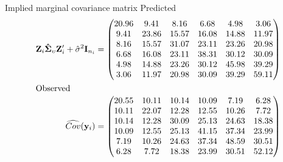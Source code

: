 \documentclass[aspectratio=169]{beamer}
\newcommand{\vect}[1]{\mathbf{#1}}
\newcommand{\mat}[1]{\mathbf{#1}}
\newcommand{\gmat}[1]{\boldsymbol{#1}}
\begin{document}
\begin{frame}[fragile]{Implied marginal covariance matrix}
Predicted
\begin{align*}
  \mat{Z}_i \gmat{\hat\Sigma}_\upsilon \mat{Z}'_i +
    \hat\sigma^2 \mat{I}_{n_i} &= 
  \begin{pmatrix}
    20.96 & 9.41 & 8.16 & 6.68 & 4.98 & 3.06 \\ 
    9.41 & 23.86 & 15.57 & 16.08 & 14.88 & 11.97 \\ 
    8.16 & 15.57 & 31.07 & 23.11 & 23.26 & 20.98 \\ 
    6.68 & 16.08 & 23.11 & 38.31 & 30.12 & 30.09 \\ 
    4.98 & 14.88 & 23.26 & 30.12 & 45.98 & 39.29 \\ 
    3.06 & 11.97 & 20.98 & 30.09 & 39.29 & 59.11
  \end{pmatrix}\\
  \intertext{\color{black}Observed}
  \widehat{Cov}(\vect{y}_i) &=
  \begin{pmatrix}
    20.55 & 10.11 & 10.14 & 10.09 & 7.19 & 6.28 \\ 
    10.11 & 22.07 & 12.28 & 12.55 & 10.26 & 7.72 \\ 
    10.14 & 12.28 & 30.09 & 25.13 & 24.63 & 18.38 \\ 
    10.09 & 12.55 & 25.13 & 41.15 & 37.34 & 23.99 \\ 
    7.19 & 10.26 & 24.63 & 37.34 & 48.59 & 30.51 \\ 
    6.28 & 7.72 & 18.38 & 23.99 & 30.51 & 52.12 \\ 
  \end{pmatrix}\\
\end{align*}
% 
% 
% 
\end{frame}
\end{document}
